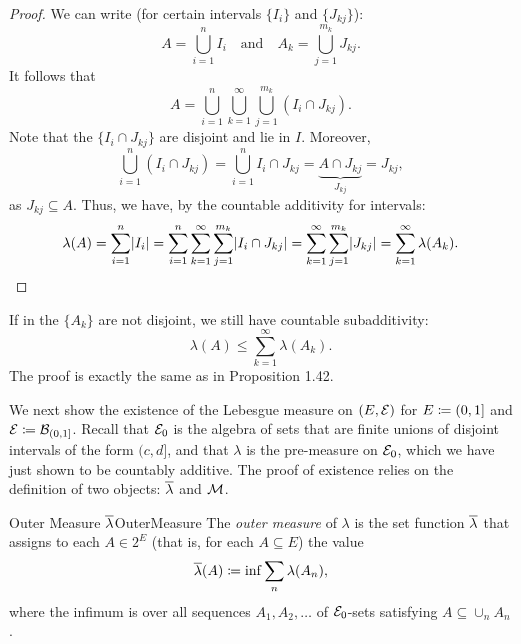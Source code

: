 \begin{proof}
	We can write (for certain intervals \(\{I_i\}\) and \(\{J_{kj}\}\)):
	\begin{equation*}
		A = \bigcup_{i=1}^n I_i \quad \text{and} \quad A_k = \bigcup_{j=1}^{m_k} J_{kj}.
	\end{equation*}
	It follows that
	\begin{equation*}
		A = \bigcup_{i=1}^n \bigcup_{k=1}^\infty \bigcup_{j=1}^{m_k} (I_i \cap J_{kj}).
	\end{equation*}
	Note that the \(\{I_i \cap J_{kj}\}\) are disjoint and lie in \(I\). Moreover,
	\begin{equation*}
		\bigcup_{i=1}^n (I_i \cap J_{kj}) = \bigcup_{i=1}^n I_i \cap J_{kj} = \underbrace{A \cap J_{kj}}_{J_{kj}} = J_{kj},
	\end{equation*}
	as \(J_{kj} \subseteq A\). Thus, we have, by the countable additivity for intervals:
	\begin{equation*}
		\lambda(A) = \sum_{i=1}^n \lvert I_i\rvert = \sum_{i=1}^n \sum_{k=1}^\infty \sum_{j=1}^{m_k} \lvert I_i \cap J_{kj}\rvert = \sum_{k=1}^\infty \sum_{j=1}^{m_k} \lvert J_{kj}\rvert = \sum_{k=1}^\infty \lambda(A_k).
	\end{equation*}
\end{proof}

If in  the \(\{A_k\}\) are not disjoint, we still have countable subadditivity:
\begin{equation}
	\lambda(A) \le \sum_{k=1}^\infty \lambda(A_k).
	\label{eq:IntervalSubadditivity}
\end{equation}
The proof is exactly the same as in Proposition 1.42.

We next show the existence of the Lebesgue measure on \((E, \mathcal{E})\) for \(E \coloneqq \lparen 0, 1 \rbrack\) and \(\mathcal{E} \coloneqq \mathcal{B}_{\lparen 0,1 \rbrack}\). Recall that \(\mathcal{E}_0\) is the algebra of sets that are finite unions of disjoint intervals of the form \(\lparen c, d \rbrack\), and that \(\lambda\) is the pre-measure on \(\mathcal{E}_0\), which we have just shown to be countably additive. The proof of existence relies on the definition of two objects: \(\overline{\lambda}\) and \(\mathcal{M}\).

\begin{defn}{Outer Measure \(\overline{\lambda}\)}{OuterMeasure}
	The \textit{outer measure} of \(\lambda\) is the set function \(\overline{\lambda}\) that assigns to each \(A \in 2^E\) (that is, for each \(A \subseteq E\)) the value
	\begin{equation}
		\overline{\lambda}(A) \coloneqq \inf \sum_n \lambda(A_n),
		\label{eq:OuterMeasureDef}
	\end{equation}
	where the infimum is over all sequences \(A_1, A_2, \dots\) of \(\mathcal{E}_0\)-sets satisfying \(A \subseteq \cup_n A_n\).
\end{defn}

